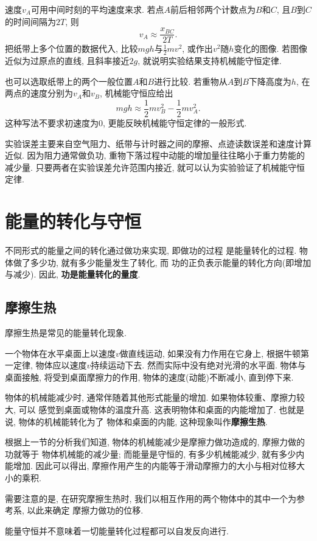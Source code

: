 \documentclass[11pt,a4paper]{ctexbook}
\begin{document}
速度$v_A$可用中间时刻的平均速度来求. 若点$A$前后相邻两个计数点为$B$和$C$, 且$B$到$C$的时间间隔为$2T$,
则
$$v_A\approx \frac{x_{BC}}{2T}.$$
把纸带上多个位置的数据代入, 比较$mgh$与$\displaystyle\frac12mv^2$, 或作出$v^2$随$h$变化的图像.
若图像近似为过原点的直线, 且斜率接近$2g$, 就说明实验结果支持机械能守恒定律.

也可以选取纸带上的两个一般位置$A$和$B$进行比较. 若重物从$A$到$B$下降高度为$h$,
在两点的速度分别为$v_A$和$v_B$, 机械能守恒应给出
$$mgh\approx \frac12mv_B^2-\frac12mv_A^2.$$
这种写法不要求初速度为0, 更能反映机械能守恒定律的一般形式.

实验误差主要来自空气阻力、纸带与计时器之间的摩擦、点迹读数误差和速度计算近似. 因为阻力通常做负功,
重物下落过程中动能的增加量往往略小于重力势能的减少量. 只要两者在实验误差允许范围内接近,
就可以认为实验验证了机械能守恒定律.

\section{能量的转化与守恒}

不同形式的能量之间的转化通过做功来实现, 即做功的过程
是能量转化的过程. 物体做了多少功, 就有多少能量发生了转化, 而
功的正负表示能量的转化方向(即增加与减少). 因此, \textbf{功是能量转化的量度}.

\subsection{摩擦生热}

摩擦生热是常见的能量转化现象.

一个物体在水平桌面上以速度$v$做直线运动, 如果没有力作用在它身上, 根据牛顿第一定律,
物体应以速度$v$持续运动下去. 然而实际中没有绝对光滑的水平面. 物体与桌面接触,
将受到桌面摩擦力的作用, 物体的速度(动能)不断减小, 直到停下来.

物体的机械能减少时, 通常伴随着其他形式能量的增加. 如果物体较重、摩擦力较大, 可以
感觉到桌面或物体的温度升高. 这表明物体和桌面的内能增加了. 也就是说, 物体的机械能转化为了
物体和桌面的内能, 这种现象叫作\textbf{摩擦生热}.

根据上一节的分析我们知道, 物体的机械能减少是摩擦力做功造成的, 摩擦力做的功就等于
物体机械能的减少量; 而能量是守恒的, 有多少机械能减少, 就有多少内能增加.
因此可以得出, 摩擦作用产生的内能等于滑动摩擦力的大小与相对位移大小的乘积.

需要注意的是, 在研究摩擦生热时, 我们以相互作用的两个物体中的其中一个为参考系, 以此来确定
摩擦力做功的位移.

{\kaishu 能量守恒并不意味着一切能量转化过程都可以自发反向进行.}
\end{document}
